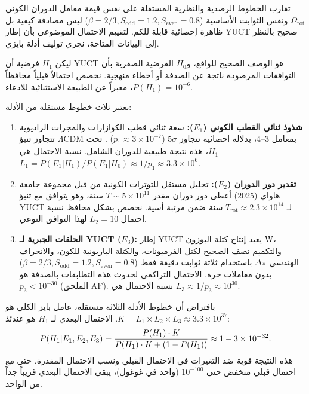 \documentclass[12pt,a4paper]{article}
\begin{document}
	تقارب الخطوط الرصدية والنظرية المستقلة على نفس قيمة معامل الدوران الكوني \(\Omega_{\mathrm{rot}}\) ونفس الثوابت الأساسية (\(\beta=2/3, S_{\mathrm{odd}}=1.2, S_{\mathrm{even}}=0.8\)) ليس مصادفة كيفية بل ظاهرة إحصائية قابلة للكم. لتقييم الاحتمال الموضوعي بأن إطار YUCT صحيح بالنظر إلى البيانات المتاحة، نجري توليف أدلة بايزي.
	
	ليكن \(H_1\) فرضية أن YUCT هو الوصف الصحيح للواقع، و\(H_0\) الفرضية الصفرية بأن التوافقات المرصودة ناتجة عن الصدفة أو أخطاء منهجية. نخصص احتمالاً قبلياً محافظاً \(P(H_1) = 10^{-6}\)، معبراً عن الطبيعة الاستثنائية للادعاء.
	
	نعتبر ثلاث خطوط مستقلة من الأدلة:
	\begin{enumerate}
		\item \textbf{شذوذ ثنائي القطب الكوني (\(E_1\)):} سعة ثنائي قطب الكوازارات والمجرات الراديوية تتجاوز تنبؤ \(\Lambda\)CDM بمعامل 3--4، بدلالة إحصائية تتجاوز \(5\sigma\) (\(p_1 \approx 3 \times 10^{-7}\)) \cite{Secrest2025, Singal2024}. تحت \(H_1\)، هذه نتيجة طبيعية للدوران الشامل. نسبة الاحتمال هي \(L_1 = P(E_1|H_1)/P(E_1|H_0) \approx 1/p_1 \approx 3.3 \times 10^6\).
		
		\item \textbf{تقدير دور الدوران (\(E_2\)):} تحليل مستقل للتوترات الكونية من قبل مجموعة جامعة هاواي (2025) أعطى دور دوران مقدر \(T \sim 5 \times 10^{11}\) سنة، وهو يتوافق مع تنبؤ YUCT لـ \(T_{\mathrm{rot}} \approx 2.3 \times 10^{14}\) سنة ضمن مرتبة أسية. نخصص بشكل محافظ نسبة احتمال \(L_2 = 10\) لهذا التوافق النوعي.
		
		\item \textbf{الحلقات الجبرية لـ YUCT (\(E_3\)):} إطار YUCT يعيد إنتاج كتلة البوزون W، والتكميم نصف الصحيح لكتل الفرميونات، والكتلة الباريونية للكون، والانحراف الهندسي \(\Delta\pi\) باستخدام ثلاثة ثوابت دقيقة فقط (\(\beta=2/3, S_{\mathrm{odd}}=1.2, S_{\mathrm{even}}=0.8\)) بدون معاملات حرة. الاحتمال التراكمي لحدوث هذه التطابقات بالصدفة هو \(p_3 < 10^{-30}\) (الملحق AF). نسبة الاحتمال هي \(L_3 \approx 1/p_3 \approx 10^{30}\).
	\end{enumerate}
	
	بافتراض أن خطوط الأدلة الثلاثة مستقلة، عامل بايز الكلي هو \(K = L_1 \times L_2 \times L_3 \approx 3.3 \times 10^{37}\). الاحتمال البعدي لـ \(H_1\) هو عندئذ:
	\begin{equation}
		\scriptsize
		P(H_1 | E_1, E_2, E_3) = \frac{P(H_1) \cdot K}{P(H_1) \cdot K + (1 - P(H_1))} \approx 1 - 3 \times 10^{-32}.
	\end{equation}
	هذه النتيجة قوية ضد التغيرات في الاحتمال القبلي ونسب الاحتمال المقدرة. حتى مع احتمال قبلي منخفض حتى \(10^{-100}\) (واحد في غوغول)، يبقى الاحتمال البعدي قريباً جداً من الواحد.
	
\end{document}
